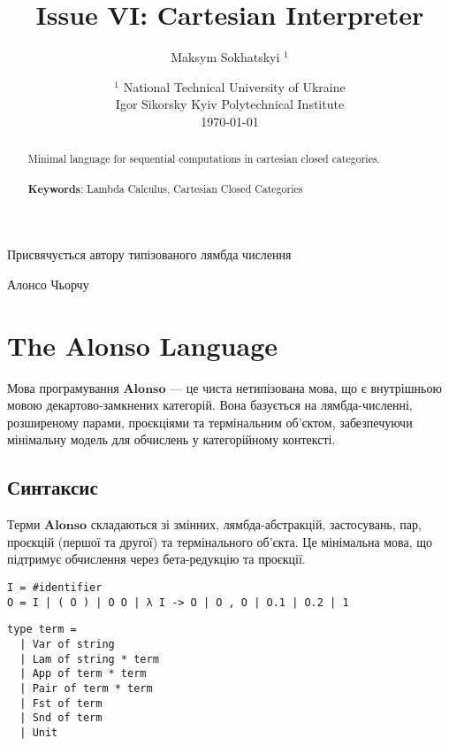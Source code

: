 \documentclass{article}
\begin{document}
\title{Issue VI: Cartesian Interpreter}
\author{Maksym Sokhatskyi $^1$}
\date{ $^1$ National Technical University of Ukraine \\
       \small Igor Sikorsky Kyiv Polytechnical Institute \\
       \today }

\maketitle

\begin{abstract}

Minimal language for sequential computations in cartesian closed categories.
\\
\\
{\bf Keywords}: Lambda Calculus, Cartesian Closed Categories
\end{abstract}

\ifincludeTOC
  \tableofcontents
\fi

\newpage

\epigraph{Присвячується автору типізованого лямбда числення}{Алонсо Чьорчу}

\section{The Alonso Language}

Мова програмування $\mathbf{Alonso}$ — це чиста нетипізована мова, що є внутрішньою мовою декартово-замкнених категорій. Вона базується на лямбда-численні, розширеному парами, проєкціями та термінальним об’єктом, забезпечуючи мінімальну модель для обчислень у категорійному контексті.

\subsection{Синтаксис}

Терми $\mathbf{Alonso}$ складаються зі змінних, лямбда-абстракцій, застосувань, пар, проєкцій (першої та другої) та термінального об’єкта. Це мінімальна мова, що підтримує обчислення через бета-редукцію та проєкції.

\begin{lstlisting}[mathescape=true]
I = #identifier
O = I | ( O ) | O O | λ I -> O | O , O | O.1 | O.2 | 1
\end{lstlisting}

\begin{lstlisting}[mathescape=true]
type term =
  | Var of string
  | Lam of string * term
  | App of term * term
  | Pair of term * term
  | Fst of term
  | Snd of term
  | Unit
\end{lstlisting}
\end{document}
